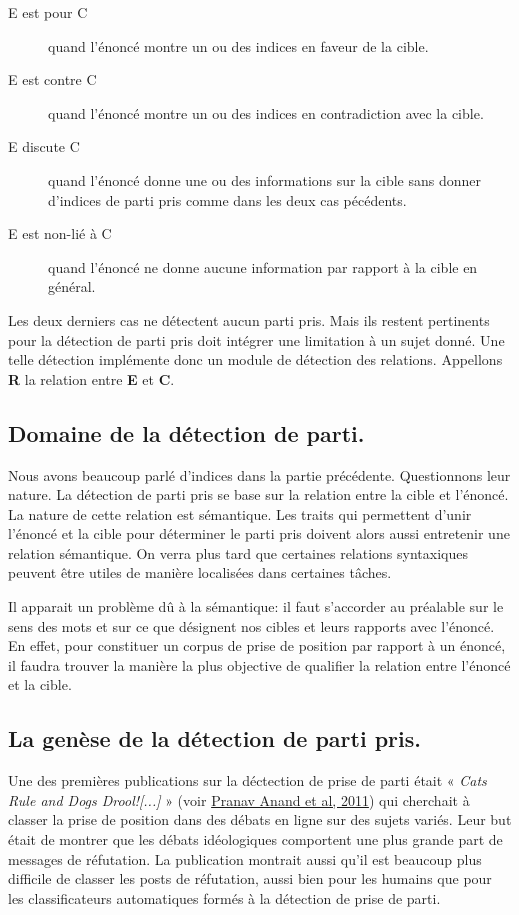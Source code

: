 \documentclass[11pt,a4paper,oldfontcommands]{memoir}
\begin{document}
\begin{description}
 \item [E est pour C] quand l'énoncé montre un ou des indices en faveur de la cible.
 \item [E est contre C] quand l'énoncé montre un ou des indices en contradiction avec la cible.
 \item [E discute C] quand l'énoncé donne une ou des informations sur la cible sans donner d'indices de parti pris comme dans les deux cas pécédents.
 \item [E est non-lié à C] quand l'énoncé ne donne aucune information par rapport à la cible en général.
\end{description}

Les deux derniers cas ne détectent aucun parti pris.
Mais ils restent pertinents pour la détection de parti pris doit intégrer une limitation à un sujet donné.
Une telle détection implémente donc un module de détection des relations.
Appellons \textbf{R} la relation entre \textbf{E} et \textbf{C}.


\subsection{Domaine de la détection de parti.}
Nous avons beaucoup parlé d'indices dans la partie précédente.
Questionnons leur nature.
La détection de parti pris se base sur la relation entre la cible et l'énoncé.
La nature de cette relation est sémantique.
Les traits qui permettent d'unir l'énoncé et la cible pour déterminer le parti pris doivent alors aussi entretenir une relation sémantique.
On verra plus tard que certaines relations syntaxiques peuvent être utiles de manière localisées dans certaines tâches.

Il apparait un problème dû à la sémantique: il faut s'accorder au préalable sur le sens des mots et sur ce que désignent nos cibles et leurs rapports avec l'énoncé.
En effet, pour constituer un corpus de prise de position par rapport à un énoncé, il faudra trouver la manière la plus objective de qualifier la relation entre l'énoncé et la cible.
\subsection{La genèse de la détection de parti pris.}

Une des premières publications sur la déctection de prise de parti était «  \textit{Cats Rule and Dogs Drool![...]} » (voir \href{http://www.aclweb.org/anthology/W11-1701}{Pranav Anand et al, 2011}) qui cherchait à classer la prise de position dans des débats en ligne sur des sujets variés.
Leur but était de montrer que les débats idéologiques comportent une plus grande part de messages de réfutation.
La publication montrait aussi qu'il est beaucoup plus difficile de classer les posts de réfutation, aussi bien pour les humains que pour les classificateurs automatiques formés à la détection de prise de parti.
\end{document}
